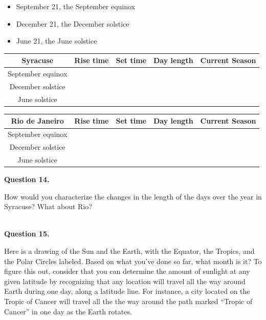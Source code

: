 \documentclass[11pt]{article}
\begin{document}
\begin{itemize}
\item September 21, the September equinox
\item December 21, the December solstice 
\item June 21, the June solstice 
\end{itemize}

\begin{center}


\begin{tabular}{|c| c |c|c|c|}
\hline
\Large Syracuse \normalsize
 & Rise time & Set time & Day length & Current Season\\
\hline
September equinox & & & & \\
\hline
December solstice & & & & \\
\hline
June solstice & & & & \\
\hline
\end{tabular}
\normalsize
\end{center}

\bigskip

\begin{center}
\begin{tabular}{|c| c |c|c|c|}
\hline
\Large Rio de Janeiro \normalsize
 & Rise time & Set time & Day length & Current Season\\
\hline
September equinox & & & & \\
\hline
December solstice & & & & \\
\hline
June solstice & & & & \\
\hline
\end{tabular}
\normalsize
\end{center}
\textbf{Question 14.}

How would you characterize the changes in the length of the days over the year in Syracuse? What about Rio?

\vspace*{1.5cm}
\hrulefill\\
\newpage
\textbf{Question 15.}

Here is a drawing of the Sun and the Earth, with the Equator, the Tropics, and the Polar Circles labeled.
Based on what you've done so far, what month is it? To figure this out, consider that you can determine the amount of sunlight at any given
latitude by recognizing that any location will travel all the way around Earth during one day, along a latitude line. For instance,
a city located on the Tropic of Cancer will travel all the the way around the path marked ``Tropic of Cancer'' in one day as the Earth rotates. 
\end{document}
